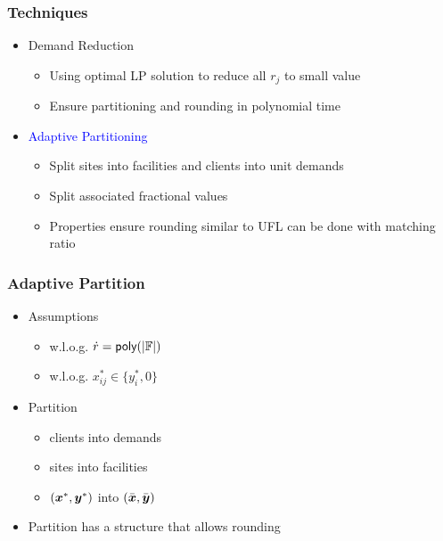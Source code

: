 \documentclass[handout, hyperref, dvipsnames]{beamer}
\begin{document}
\begin{frame}

  \frametitle{Techniques}
  \begin{itemize}\addtolength{\itemsep}{2\baselineskip}

  \item {\Large {Demand Reduction}}
    \vspace{.1in}
    \begin{itemize}\addtolength{\itemsep}{1\baselineskip}
    \item  {\large Using optimal LP solution to reduce all $r_j$ to small value}
    \item  {\large Ensure partitioning and rounding in polynomial time}
    \end{itemize}
    
  \item {\Large \textcolor{blue}{Adaptive Partitioning}}
    \vspace{.1in}
    \begin{itemize}\addtolength{\itemsep}{1\baselineskip}
    \item \alert{\large Split sites into facilities and clients into unit demands}
    \item \alert{\large Split associated fractional values}
    \item \alert{\large Properties ensure rounding similar to UFL can be done with matching ratio}
    \end{itemize}
  \end{itemize}
\end{frame}

\begin{frame}
  \frametitle{Adaptive Partition}
  \begin{itemize}
    \addtolength{\itemsep}{1\baselineskip}
    \item \Large{Assumptions}
      \begin{itemize}
      \item \large{w.l.o.g. ${\dot r} = {\mbox{\sf poly}}(|\mathbb{F}|)$}
      \item \large{w.l.o.g. $x_{ij}^\ast \in \{y_i^\ast, 0\}$}
      \end{itemize}
    \item \Large{Partition}
       \begin{itemize}
       \item \large{clients into demands}
       \item \large{sites into facilities}
       \item \large{$(\boldsymbol{x}^\ast,\boldsymbol{y}^\ast)$ into $(\bar{\boldsymbol{x}}, \bar{\boldsymbol{y}})$}
       \end{itemize}
     \item \Large{Partition has a structure that allows rounding}
  \end{itemize}
\end{frame}
\end{document}
